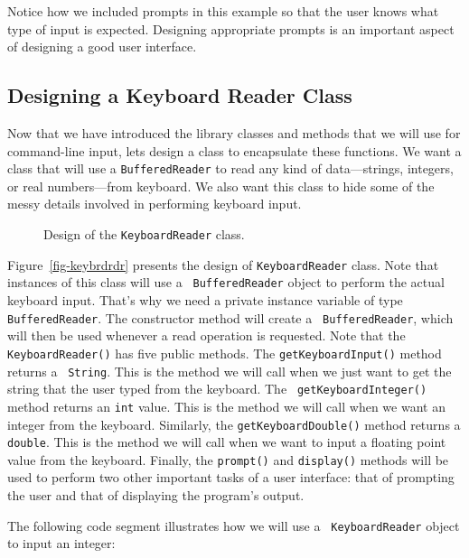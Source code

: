 \noindent Notice how we included prompts in this example 
so that the user knows what type of input is expected. Designing
appropriate prompts is an important aspect of designing a good user
interface.



\subsection{Designing a Keyboard Reader Class}

Now that we have introduced the library classes and methods that we
will use for command-line input, lets design a class to encapsulate
these functions. We want a class that will use a {\tt BufferedReader}
to read any kind of data---strings, integers, or real numbers---from
keyboard.  We also want this class to hide some of the messy details
involved in performing keyboard input.

\begin{figure}[h]
{Design of the {\tt KeyboardReader} class.
\label{fig-keybrdrdr}
\label{pg-fig-keybrdrdr}}
\end{figure}

Figure~\ref{fig-keybrdrdr} presents the design of {\tt KeyboardReader}
class.  Note that instances of this class will use a {\tt
BufferedReader} object to perform the actual keyboard input. That's
why we need a private instance variable of type {\tt
BufferedReader}. The constructor method will create a {\tt
BufferedReader}, which will then be used whenever a read operation is
requested.  Note that the {\tt KeyboardReader()} has five public
methods. The {\tt getKeyboardInput()} method returns a {\tt
String}. This is the method we will call when we just want to get the
string that the user typed from the keyboard.  The {\tt
getKeyboardInteger()} method returns an {\tt int} value. This is the
method we will call when we want an integer from the
keyboard. Similarly, the {\tt getKeyboardDouble()} method returns a
{\tt double}. This is the method we will call when we want to input a
floating point value from the keyboard. Finally, the {\tt prompt()}
and {\tt display()} methods will be used to perform two other
important tasks of a user interface: that of prompting the user and
that of displaying the program's output.

The following code segment illustrates how we will use a {\tt
Key\-board\-Read\-er} object to input an integer:

